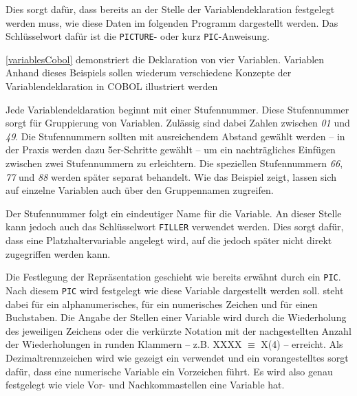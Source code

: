 Dies sorgt dafür, dass bereits an der Stelle der Variablendeklaration festgelegt werden muss, wie diese Daten im folgenden Programm dargestellt werden. Das Schlüsselwort dafür ist die \texttt{PICTURE}- oder kurz \texttt{PIC}-Anweisung.

\sepCodeAndOutputCheck
{}
\autoref{variablesCobol} demonstriert die Deklaration von vier Variablen. Variablen Anhand dieses Beispiels sollen wiederum verschiedene Konzepte der Variablendeklaration in COBOL illustriert werden

Jede Variablendeklaration beginnt mit einer Stufennummer. Diese Stufennummer sorgt für Gruppierung von Variablen. Zulässig sind dabei Zahlen zwischen \textit{01} und \textit{49}. Die Stufennummern sollten mit ausreichendem Abstand gewählt werden -- in der Praxis werden dazu 5er-Schritte gewählt --  um ein nachträgliches Einfügen zwischen zwei Stufennummern zu erleichtern. Die speziellen Stufennummern \textit{66}, \textit{77} und \textit{88} werden später separat behandelt. Wie das Beispiel zeigt, lassen sich auf einzelne Variablen auch über den Gruppennamen zugreifen. 

Der Stufennummer folgt ein eindeutiger Name für die Variable. An dieser Stelle kann jedoch auch das Schlüsselwort \texttt{FILLER} verwendet werden. Dies sorgt dafür, dass eine Platzhaltervariable angelegt wird, auf die jedoch später nicht direkt zugegriffen werden kann.

Die Festlegung der Repräsentation geschieht wie bereits erwähnt durch ein \texttt{PIC}. Nach diesem \texttt{PIC} wird festgelegt wie diese Variable dargestellt werden soll.  steht dabei für ein alphanumerisches,  für ein numerisches Zeichen und  für einen Buchstaben. Die Angabe der Stellen einer Variable wird durch die Wiederholung des jeweiligen Zeichens oder die verkürzte Notation mit der nachgestellten Anzahl der Wiederholungen in runden Klammern -- z.B. XXXX $\equiv$ X(4) -- erreicht. Als Dezimaltrennzeichen wird wie gezeigt ein  verwendet und ein vorangestelltes  sorgt dafür, dass eine numerische Variable ein Vorzeichen führt. Es wird also genau festgelegt wie viele Vor- und Nachkommastellen eine Variable hat.

